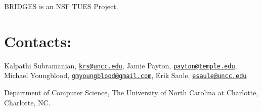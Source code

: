 B\+R\+I\+D\+G\+ES is an N\+SF T\+U\+ES Project.\hypertarget{index_contacts_sec}{}\section{Contacts\+:}\label{index_contacts_sec}
Kalpathi Subramanian, \href{mailto:krs@uncc.edu}{\tt krs@uncc.\+edu}, Jamie Payton, \href{mailto:payton@temple.edu}{\tt payton@temple.\+edu}, Michael Youngblood, \href{mailto:gmyoungblood@gmail.com}{\tt gmyoungblood@gmail.\+com}, Erik Saule, \href{mailto:esaule@uncc.edu}{\tt esaule@uncc.\+edu}

Department of Computer Science, The University of North Carolina at Charlotte, Charlotte, NC. 